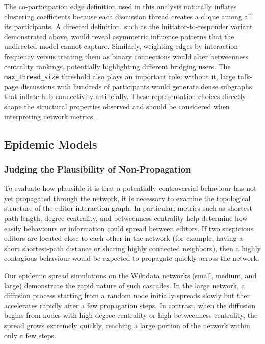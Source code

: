 \documentclass[conference]{IEEEtran}
\begin{document}
The co-participation edge definition used in this analysis naturally inflates clustering coefficients because each discussion thread creates a clique among all its participants. A directed definition, such as the initiator-to-responder variant demonstrated above, would reveal asymmetric influence patterns that the undirected model cannot capture. Similarly, weighting edges by interaction frequency versus treating them as binary connections would alter betweenness centrality rankings, potentially highlighting different bridging users. The \texttt{max\_thread\_size} threshold also plays an important role: without it, large talk-page discussions with hundreds of participants would generate dense subgraphs that inflate hub connectivity artificially. These representation choices directly shape the structural properties observed and should be considered when interpreting network metrics.

\subsection{Epidemic Models}

\subsubsection{Judging the Plausibility of Non-Propagation}
To evaluate how plausible it is that a potentially controversial behaviour has not yet propagated through the network, it is necessary to examine the topological structure of the editor interaction graph. In particular, metrics such as shortest path length, degree centrality, and betweenness centrality help determine how easily behaviours or information could spread between editors. If two suspicious editors are located close to each other in the network (for example, having a short shortest-path distance or sharing highly connected neighbors), then a highly contagious behaviour would be expected to propagate quickly across the network. 

Our epidemic spread simulations on the Wikidata networks (small, medium, and large) demonstrate the rapid nature of such cascades. In the large network, a diffusion process starting from a random node initially spreads slowly but then accelerates rapidly after a few propagation steps. In contrast, when the diffusion begins from nodes with high degree centrality or high betweenness centrality, the spread grows extremely quickly, reaching a large portion of the network within only a few steps. 
\end{document}
